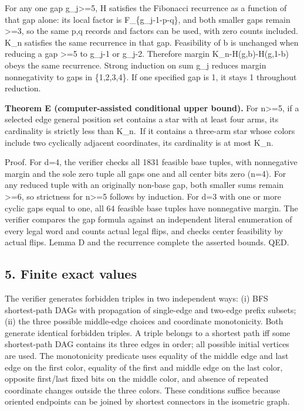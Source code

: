 \documentclass[
  10pt,
]{article}
\begin{document}
For any one gap g\_j\textgreater=5, H satisfies the Fibonacci recurrence
as a function of that gap alone: its local factor is F\_\{g\_j-1-p-q\},
and both smaller gaps remain \textgreater=3, so the same p,q records and
factors can be used, with zero counts included. K\_n satisfies the same
recurrence in that gap. Feasibility of b is unchanged when reducing a
gap \textgreater=5 to g\_j-1 or g\_j-2. Therefore margin
K\_n-H(g,b)-H(g,1-b) obeys the same recurrence. Strong induction on sum
g\_j reduces margin nonnegativity to gaps in \{1,2,3,4\}. If one
specified gap is 1, it stays 1 throughout reduction.

\textbf{Theorem E (computer-assisted conditional upper bound).} For
n\textgreater=5, if a selected edge general position set contains a star
with at least four arms, its cardinality is strictly less than K\_n.~If
it contains a three-arm star whose colors include two cyclically
adjacent coordinates, its cardinality is at most K\_n.

Proof. For d=4, the verifier checks all 1831 feasible base tuples, with
nonnegative margin and the sole zero tuple all gaps one and all center
bits zero (n=4). For any reduced tuple with an originally non-base gap,
both smaller sums remain \textgreater=6, so strictness for
n\textgreater=5 follows by induction. For d=3 with one or more cyclic
gaps equal to one, all 64 feasible base tuples have nonnegative margin.
The verifier compares the gap formula against an independent literal
enumeration of every legal word and counts actual legal flips, and
checks center feasibility by actual flips. Lemma D and the recurrence
complete the asserted bounds. QED.

\subsection{5. Finite exact values}\label{finite-exact-values}

The verifier generates forbidden triples in two independent ways: (i)
BFS shortest-path DAGs with propagation of single-edge and two-edge
prefix subsets; (ii) the three possible middle-edge choices and
coordinate monotonicity. Both generate identical forbidden triples. A
triple belongs to a shortest path iff some shortest-path DAG contains
its three edges in order; all possible initial vertices are used. The
monotonicity predicate uses equality of the middle edge and last edge on
the first color, equality of the first and middle edge on the last
color, opposite first/last fixed bits on the middle color, and absence
of repeated coordinate changes outside the three colors. These
conditions suffice because oriented endpoints can be joined by shortest
connectors in the isometric graph.
\end{document}
